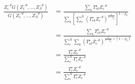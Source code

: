 \documentclass[10pt]{article}
\begin{document}
\begin{align*}
    \frac{Z_c^{-\theta} G(Z_1^{-\theta}, \dots, Z_N^{-\theta})}{G(Z_1^{-\theta}, \dots, Z_N^{-\theta})} & = \frac{\sum_{k}^{} T_{ck}^{\star} Z_c^{-\theta}}{\sum_{k}^{} [\sum_{c}^{N} (T_{ck}^{\star} Z_c^{-\theta})^{\frac{1}{1 - \rho_k}}]^{1 - \rho_k}}      \\
                                                                                                        & = \frac{\sum_{k}^{} T_{ck}^{\star} Z_c^{-\theta}}{\sum_{c}^{N} \sum_{k}^{} (T_{ck}^{\star} Z_c^{-\theta})^{\frac{1}{1 - \rho_k} \times (1 - \rho_k)}} \\
                                                                                                        & = \frac{T_c^{\star} Z_c^{-\theta}}{\sum_{c}^{N} T_c^{\star} Z_c^{-\theta}}                                                                            \\
                                                                                                        & = \frac{T_c^{\star} Z_c^{-\theta}}{\sum_{c}^{N} T_c^{\star} Z_c^{-\theta}}
\end{align*}




\end{document}

